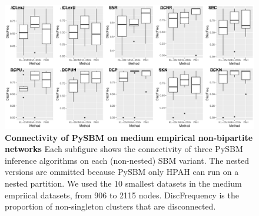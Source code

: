 \documentclass[aps,pre,superscriptaddress]{revtex4}
\begin{document}
\begin{figure}[!htpb]
	\centering
	\includegraphics[width=\textwidth]{figures/pysbm_disc.pdf}
	\caption[]{
		\textbf{Connectivity of PySBM on medium empirical non-bipartite networks}
		Each subfigure shows the connectivity of three PySBM inference algorithms on each (non-nested) SBM variant.
		The nested versions are ommitted because PySBM only HPAH can run on a nested partition.
		We used the 10 smallest datasets in the medium empriical datasets, from 906 to 2115 nodes.
        DiscFrequency is the proportion of non-singleton clusters that are disconnected.
	}
	\label{fig:pysbm_disc.pdf}
\end{figure}
\end{document}
